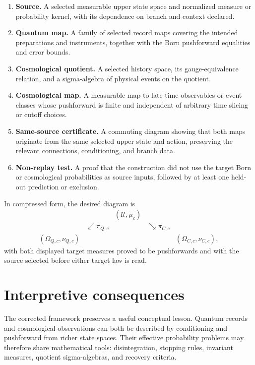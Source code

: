 \documentclass[11pt]{article}
\newcommand{\U}{\mathcal{U}}
\begin{document}
\begin{enumerate}
\item \textbf{Source.} A selected measurable upper state space and normalized
measure or probability kernel, with its dependence on branch and context
declared.
\item \textbf{Quantum map.} A family of selected record maps covering the
intended preparations and instruments, together with the Born pushforward
equalities and error bounds.
\item \textbf{Cosmological quotient.} A selected history space, its
gauge-equivalence relation, and a sigma-algebra of physical events on the
quotient.
\item \textbf{Cosmological map.} A measurable map to late-time observables or
event classes whose pushforward is finite and independent of arbitrary time
slicing or cutoff choices.
\item \textbf{Same-source certificate.} A commuting diagram showing that both
maps originate from the same selected upper state and action, preserving the
relevant connections, conditioning, and branch data.
\item \textbf{Non-replay test.} A proof that the construction did not use the
target Born or cosmological probabilities as source inputs, followed by at
least one held-out prediction or exclusion.
\end{enumerate}

In compressed form, the desired diagram is
\[
\begin{array}{ccccc}
&&(\U,\mu_c)&&\\[2mm]
&\swarrow\pi_{Q,c}&&\searrow\pi_{C,c}&\\[1mm]
(\Omega_{Q,c},\nu_{Q,c})&&&&
(\Omega_{C,c},\nu_{C,c}),
\end{array}
\]
with both displayed target measures proved to be pushforwards and with the
source selected before either target law is read.

\section{Interpretive consequences}

The corrected framework preserves a useful conceptual lesson. Quantum records
and cosmological observations can both be described by conditioning and
pushforward from richer state spaces. Their effective probability problems may
therefore share mathematical tools: disintegration, stopping rules, invariant
measures, quotient sigma-algebras, and recovery criteria.
\end{document}
